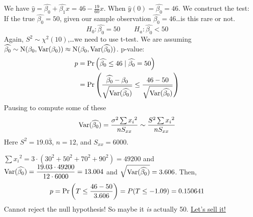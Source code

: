 \nl We have $\widehat y = \widehat{\beta_0} + \widehat{\beta_1}x = 46 - \frac{19}{60}x$. When $\widehat{y}(0)=\widehat{\beta_0} = 46$. We construct the test: If the true $\widehat{\beta_0} = 50$, given our sample observation $\widehat{\beta_0}=46$\dots is this rare or not.
$$H_0 : \widehat{\beta_0} = 50 \qquad H_a : \widehat{\beta_0} < 50$$
Again, $S^2 \sim \chi^2(10)$,\dots we need to use t-test. We are assuming $\widehat{\beta_0} \sim \operatorname{N}(\beta_0, \Var*{\beta_0}) \approx \operatorname{N}(\beta_0, \Var*{\widehat{\beta_0}})$. p-value:
\begin{align*}
    p &= \Pr \pars{\widehat{\beta_0} \leq 46 \mid \widehat{\beta_0} = 50}\\
    &= \Pr \pars{\dfrac{\widehat{\beta_0} - \beta_0}{\sqrt{\Var*{\widehat{\beta_0}}}} \leq \dfrac{46-50}{\sqrt{\Var*{\widehat{\beta_0}}}}}
\end{align*}
Pausing to compute some of these
$$\Var*{\widehat{\beta_0}} = \dfrac{\sigma^2 \sum {x_i}^2}{nS_{xx}} \sim \dfrac{S^2 \sum {x_i}^2}{nS_{xx}}$$
Here $S^2 = 19.0\overline{3}$, $n=12$, and $S_{xx} = 6000$.

\nl $\displaystyle \sum {x_i}^2 = 3\cdot(30^2+50^2+70^2+90^2) =49200$ and $\Var*{\widehat{\beta_0}} = \dfrac{19.03 \cdot 49200}{12 \cdot 6000} = 13.004$ and $\sqrt{\Var*{\widehat{\beta_0}}} = 3.606$. Then,
$$p = \Pr \pars{T \leq \frac{46-50}{3.606}} = P(T \leq -1.09) = 0.150641$$
Cannot reject the null hypothesis! So maybe it \textit{is} actually 50. \underline{Let's sell it!}

